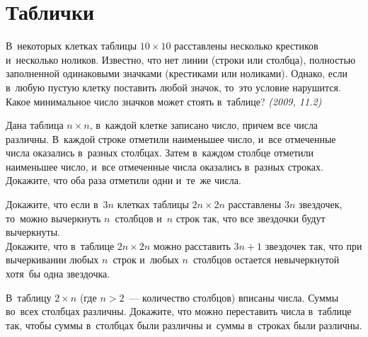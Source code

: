 
\section*{Таблички}


\begin{problems}


\item
В~некоторых клетках таблицы $10 \times 10$ расставлены несколько крестиков
и~несколько ноликов.
Известно, что нет линии (строки или столбца), полностью заполненной одинаковыми
значками (крестиками или ноликами).
Однако, если в~любую пустую клетку поставить любой значок, то~это условие
нарушится.
Какое минимальное число значков может стоять в~таблице?
\emph{(2009, 11.2)}

\item
Дана таблица $n \times n$, в~каждой клетке записано число, причем все числа
различны.
В~каждой строке отметили наименьшее число, и~все отмеченные числа оказались
в~разных столбцах.
Затем в~каждом столбце отметили наименьшее число, и~все отмеченные числа
оказались в~разных строках.
Докажите, что оба раза отметили одни и~те~же числа.

\item
\subproblem
Докажите, что если в~$3 n$ клетках таблицы $2 n \times 2 n$ расставлены $3 n$
звездочек, то~можно вычеркнуть $n$~столбцов и~$n$ строк так, что все звездочки
будут вычеркнуты.
\\
\subproblem
Докажите, что в~таблице $2 n \times 2 n$ можно расставить $3 n + 1$ звездочек
так, что при вычеркивании любых $n$~строк и~любых $n$~столбцов остается
невычеркнутой хотя~бы одна звездочка.

\item
В~таблицу $2 \times n$ (где $n > 2$~--- количество столбцов) вписаны числа.
Суммы во~всех столбцах различны.
Докажите, что можно переставить числа в~таблице так, чтобы суммы в~столбцах
были различны и~суммы в~строках были различны.


\end{problems}
